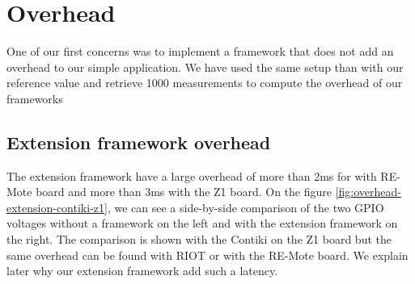 \section{Overhead}

One of our first concerns was to implement a framework that does not add an overhead to our simple application.
We have used the same setup than with our reference value and retrieve 1000 measurements to compute the overhead of our frameworks

\subsection{Extension framework overhead}

The extension framework have a large overhead of more than 2ms for with RE-Mote board and more than 3ms with the Z1 board.
On the figure \ref{fig:overhead-extension-contiki-z1}, we can see a side-by-side comparison of the two GPIO voltages without a framework on the left and with the extension framework on the right.
The comparison is shown with the Contiki on the Z1 board but the same overhead can be found with RIOT or with the RE-Mote board.
We explain later why our extension framework add such a latency.


